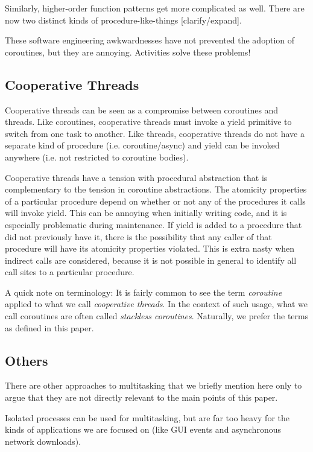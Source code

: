 \documentclass[10pt,preprint]{sigplanconf}
\begin{document}
Similarly, higher-order function patterns get more complicated as well.
There are now two distinct kinds of procedure-like-things [clarify/expand].

These software engineering awkwardnesses have not prevented the adoption of coroutines, but they are annoying.
Activities solve these problems!

\subsection{Cooperative Threads}

Cooperative threads can be seen as a compromise between coroutines and threads.
Like coroutines, cooperative threads must invoke a yield primitive to switch from one task to another.
Like threads, cooperative threads do not have a separate kind of procedure (i.e. coroutine/async) and yield can be invoked anywhere (i.e. not restricted to coroutine bodies).

Cooperative threads have a tension with procedural abstraction that is complementary to the tension in coroutine abstractions.
The atomicity properties of a particular procedure depend on whether or not any of the procedures it calls will invoke yield.
This can be annoying when initially writing code, and it is especially problematic during maintenance.
If yield is added to a procedure that did not previously have it, there is the possibility that any caller of that procedure will have its atomicity properties violated.
This is extra nasty when indirect calls are considered, because it is not possible in general to identify all call sites to a particular procedure.

A quick note on terminology: It is fairly common to see the term \emph{coroutine} applied to what we call \emph{cooperative threads}.
In the context of such usage, what we call coroutines are often called \emph{stackless coroutines}.
Naturally, we prefer the terms as defined in this paper.

\subsection{Others}

There are other approaches to multitasking that we briefly mention here only to argue that they are not directly relevant to the main points of this paper.

Isolated processes can be used for multitasking, but are far too heavy for the kinds of applications we are focused on (like GUI events and asynchronous network downloads).
\end{document}
